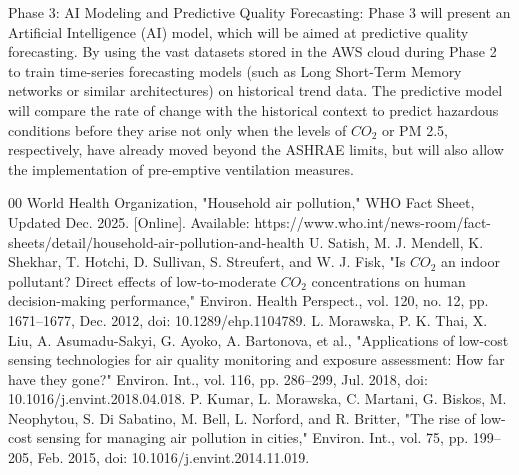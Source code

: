 \documentclass[conference]{IEEEtran}
\begin{document}
Phase 3: AI Modeling and Predictive Quality Forecasting:
Phase 3 will present an Artificial Intelligence (AI) model, which will be aimed at predictive quality forecasting. By using the vast datasets stored in the AWS cloud during Phase 2 to train time-series forecasting models (such as Long Short-Term Memory networks or similar architectures) on historical trend data. The predictive model will compare the rate of change with the historical context to predict hazardous conditions before they arise  not only when the levels of $CO_2$ or PM 2.5, respectively, have already moved beyond the ASHRAE limits, but will also allow the implementation of pre-emptive ventilation measures.


\begin{thebibliography}{00}
 World Health Organization, "Household air pollution," WHO Fact Sheet, Updated Dec. 2025. [Online]. Available: https://www.who.int/news-room/fact-sheets/detail/household-air-pollution-and-health
 U. Satish, M. J. Mendell, K. Shekhar, T. Hotchi, D. Sullivan, S. Streufert, and W. J. Fisk, "Is $CO_2$ an indoor pollutant? Direct effects of low-to-moderate $CO_2$ concentrations on human decision-making performance," Environ. Health Perspect., vol. 120, no. 12, pp. 1671–1677, Dec. 2012, doi: 10.1289/ehp.1104789.
 L. Morawska, P. K. Thai, X. Liu, A. Asumadu-Sakyi, G. Ayoko, A. Bartonova, et al., "Applications of low-cost sensing technologies for air quality monitoring and exposure assessment: How far have they gone?" Environ. Int., vol. 116, pp. 286–299, Jul. 2018, doi: 10.1016/j.envint.2018.04.018.
 P. Kumar, L. Morawska, C. Martani, G. Biskos, M. Neophytou, S. Di Sabatino, M. Bell, L. Norford, and R. Britter, "The rise of low-cost sensing for managing air pollution in cities," Environ. Int., vol. 75, pp. 199–205, Feb. 2015, doi: 10.1016/j.envint.2014.11.019.


\end{thebibliography}
\end{document}

